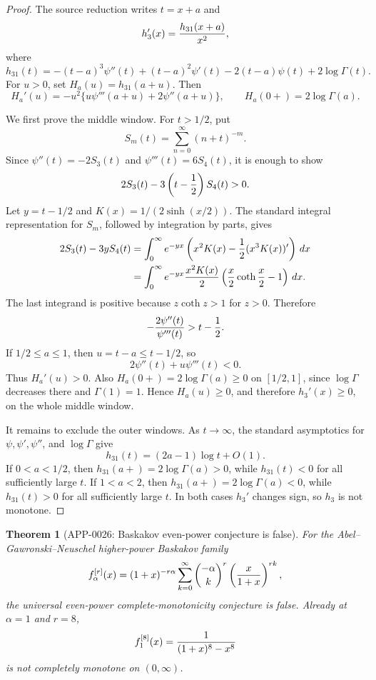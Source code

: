 \documentclass[11pt]{article}
\numberwithin{equation}{section}
\newtheorem{theorem}{Theorem}[section]
\theoremstyle{definition}
\theoremstyle{remark}
\newcommand{\1}{\mathbf 1}
\begin{document}
\begin{proof}
The source reduction writes \(t=x+a\) and
\[
 h_3'(x)={h_{31}(x+a)\over x^2},
\]
where
\[
 h_{31}(t)=-(t-a)^3\psi''(t)+(t-a)^2\psi'(t)
          -2(t-a)\psi(t)+2\log\Gamma(t).
\]
For \(u>0\), set \(H_a(u)=h_{31}(a+u)\).  Then
\[
 H_a'(u)=-u^2\{u\psi'''(a+u)+2\psi''(a+u)\},
 \qquad
 H_a(0+)=2\log\Gamma(a).
\]

We first prove the middle window.  For \(t>1/2\), put
\[
 S_m(t)=\sum_{n=0}^\infty (n+t)^{-m}.
\]
Since \(\psi''(t)=-2S_3(t)\) and \(\psi'''(t)=6S_4(t)\), it is enough to show
\[
 2S_3(t)-3\left(t-{1\over2}\right)S_4(t)>0 .
\]
Let \(y=t-1/2\) and \(K(x)=1/(2\sinh(x/2))\).  The standard integral
representation for \(S_m\), followed by integration by parts, gives
\[
\begin{aligned}
 2S_3(t)-3yS_4(t)
 &=\int_0^\infty e^{-yx}
   \left(x^2K(x)-{1\over2}(x^3K(x))'\right)\,dx  \\
 &=\int_0^\infty e^{-yx}
   {x^2K(x)\over2}\left({x\over2}\coth{x\over2}-1\right)\,dx .
\end{aligned}
\]
The last integrand is positive because \(z\coth z>1\) for \(z>0\).  Therefore
\[
 -{2\psi''(t)\over\psi'''(t)}>t-{1\over2}.
\]
If \(1/2\le a\le1\), then \(u=t-a\le t-1/2\), so
\[
 2\psi''(t)+u\psi'''(t)<0 .
\]
Thus \(H_a'(u)>0\).  Also \(H_a(0+)=2\log\Gamma(a)\ge0\) on
\([1/2,1]\), since \(\log\Gamma\) decreases there and \(\Gamma(1)=1\).
Hence \(H_a(u)\ge0\), and therefore \(h_3'(x)\ge0\), on the whole middle
window.

It remains to exclude the outer windows.  As \(t\to\infty\), the standard
asymptotics for \(\psi,\psi',\psi''\), and \(\log\Gamma\) give
\[
  h_{31}(t)=(2a-1)\log t+O(1).
\]
If \(0<a<1/2\), then \(h_{31}(a+)=2\log\Gamma(a)>0\), while
\(h_{31}(t)<0\) for all sufficiently large \(t\).  If \(1<a<2\), then
\(h_{31}(a+)=2\log\Gamma(a)<0\), while \(h_{31}(t)>0\) for all sufficiently
large \(t\).  In both cases \(h_3'\) changes sign, so \(h_3\) is not monotone.
\end{proof}

\begin{theorem}[APP-0026: Baskakov even-power conjecture is false]
\label{thm:app26-baskakov-r8}
For the Abel--Gawronski--Neuschel higher-power Baskakov family
\[
 f^{[r]}_\alpha(x)
 =(1+x)^{-r\alpha}\sum_{k=0}^\infty
 \binom{-\alpha}{k}^{r}\left({x\over1+x}\right)^{rk},
\]
the universal even-power complete-monotonicity conjecture is false.  Already
at \(\alpha=1\) and \(r=8\),
\[
 f^{[8]}_1(x)={1\over (1+x)^8-x^8}
\]
is not completely monotone on \((0,\infty)\).
\end{theorem}
\end{document}
